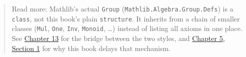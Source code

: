 \begin{quote}
Read more: Mathlib's actual \texttt{Group} (\texttt{Mathlib.Algebra.Group.Defs}) is a \texttt{class}, not this book's plain \texttt{structure}. It inherits from a chain of smaller classes (\texttt{Mul}, \texttt{One}, \texttt{Inv}, \texttt{Monoid}, \ldots) instead of listing all axioms in one place. See \hyperref[sec:13-next-steps:02-moving-to-mathlib:1]{Chapter 13} for the bridge between the two styles, and \hyperref[sec:05-rigor-check:01-structure-vs-class:1]{Chapter 5, Section 1} for why this book delays that mechanism.
\end{quote}
